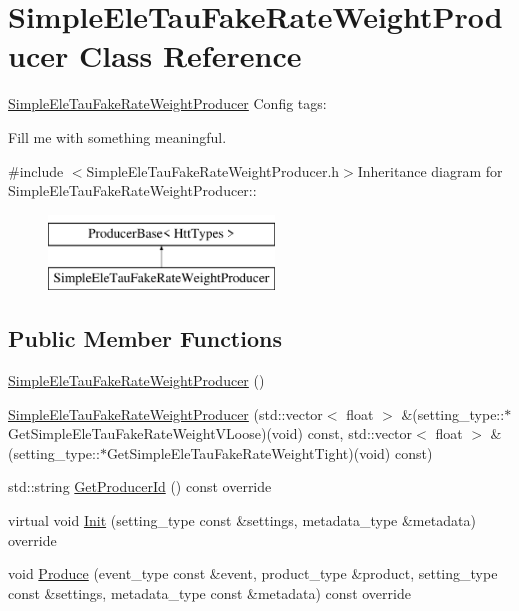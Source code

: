 \hypertarget{classSimpleEleTauFakeRateWeightProducer}{
\section{SimpleEleTauFakeRateWeightProducer Class Reference}
\label{classSimpleEleTauFakeRateWeightProducer}
}


\hyperlink{classSimpleEleTauFakeRateWeightProducer}{SimpleEleTauFakeRateWeightProducer} Config tags:
\begin{DoxyItemize}
\item Fill me with something meaningful. 
\end{DoxyItemize} 


{\ttfamily \#include $<$SimpleEleTauFakeRateWeightProducer.h$>$}Inheritance diagram for SimpleEleTauFakeRateWeightProducer::\begin{figure}[H]
\begin{center}
\leavevmode
\includegraphics[height=2cm]{classSimpleEleTauFakeRateWeightProducer}
\end{center}
\end{figure}
\subsection*{Public Member Functions}
\begin{DoxyCompactItemize}
\item 
\hyperlink{classSimpleEleTauFakeRateWeightProducer_acba890354b0cef94070c41431d311841}{SimpleEleTauFakeRateWeightProducer} ()
\item 
\hyperlink{classSimpleEleTauFakeRateWeightProducer_a7e823f4f9e2d9b660b162f0b1fbdd6b8}{SimpleEleTauFakeRateWeightProducer} (std::vector$<$ float $>$ \&(setting\_\-type::$\ast$GetSimpleEleTauFakeRateWeightVLoose)(void) const, std::vector$<$ float $>$ \&(setting\_\-type::$\ast$GetSimpleEleTauFakeRateWeightTight)(void) const)
\item 
std::string \hyperlink{classSimpleEleTauFakeRateWeightProducer_aeae1344b52e6ddd56356771a8aa199f0}{GetProducerId} () const override
\item 
virtual void \hyperlink{classSimpleEleTauFakeRateWeightProducer_a996dec4b26d77e82380e5783cb2c3704}{Init} (setting\_\-type const \&settings, metadata\_\-type \&metadata) override
\item 
void \hyperlink{classSimpleEleTauFakeRateWeightProducer_aa815dca2faf5a2a2a5ecf665f946e21f}{Produce} (event\_\-type const \&event, product\_\-type \&product, setting\_\-type const \&settings, metadata\_\-type const \&metadata) const override
\end{DoxyCompactItemize}


